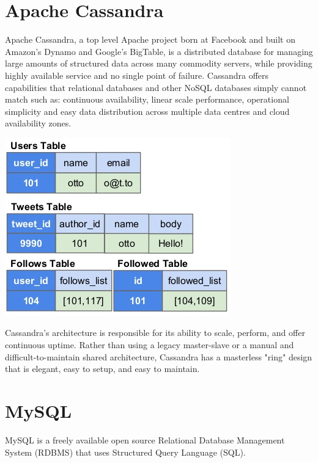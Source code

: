 \section{Apache Cassandra}\label{cassandra}
Apache Cassandra, a top level Apache project born at Facebook and built on Amazon's Dynamo and Google's BigTable, is a distributed database for managing large amounts of structured data across many commodity servers, while providing highly available service and no single point of failure.  Cassandra offers capabilities that relational databases and other NoSQL databases simply cannot match such as: continuous availability, linear scale performance, operational simplicity and easy data distribution across multiple data centres and cloud availability zones.

\begin{center}\includegraphics[width=0.75\linewidth]{images/cassandramodel}\end{center}

Cassandra's architecture is responsible for its ability to scale, perform, and offer continuous uptime. Rather than using a legacy master-slave or a manual and difficult-to-maintain shared architecture, Cassandra has a masterless "ring" design that is elegant, easy to setup, and easy to maintain.

\section{MySQL}\label{mysql}
MySQL is a freely available open source Relational Database Management System (RDBMS) that uses Structured Query Language (SQL).